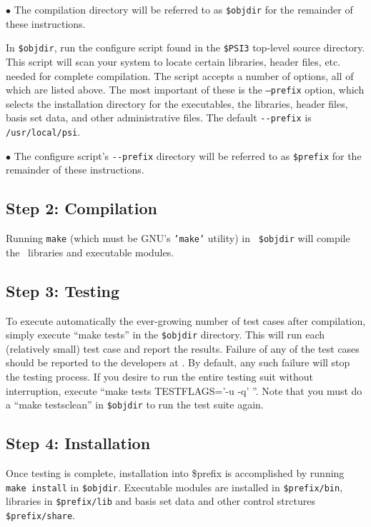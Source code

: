 \documentclass[12pt]{article}
\begin{document}
$\bullet$ The compilation directory will be referred to as {\tt \$objdir}
for the remainder of these instructions.

In {\tt \$objdir}, run the configure script found in the {\tt \$PSI3}
top-level source directory.  This script will scan your system to locate
certain libraries, header files, etc. needed for complete compilation.
The script accepts a number of options, all of which are listed above.
The most important of these is the {\tt --prefix} option, which selects the
installation directory for the executables, the libraries, header files,
basis set data, and other administrative files.  The default {\tt -}{\tt -prefix}
is {\tt /usr/local/psi}.

$\bullet$ The configure script's {\tt -}{\tt -prefix} directory will be referred
to as {\tt \$prefix} for the remainder of these instructions.

\subsection{Step 2: Compilation}

Running {\tt make} (which must be GNU's {\tt 'make'} utility) in {\tt
\$objdir} will compile the \PSIthree\ libraries and executable
modules.

\subsection{Step 3: Testing}

To execute automatically the ever-growing number of test cases after
compilation, simply execute ``make tests'' in the {\tt \$objdir}
directory.  This will run each (relatively small) test case and report
the results.  Failure of any of the test cases should be reported to
the developers at \PSIemail. By default, any such failure will stop
the testing process.  If you desire to run the entire testing suit
without interruption, execute ``make tests TESTFLAGS='-u -q' ''. Note
that you must do a ``make testsclean'' in {\tt \$objdir} to run the test
suite again.

\subsection{Step 4: Installation}

Once testing is complete, installation into \$prefix is accomplished by
running {\tt make install} in {\tt \$objdir}.   Executable modules are
installed in {\tt \$prefix/bin}, libraries in {\tt \$prefix/lib} and basis 
set data and other control strctures {\tt \$prefix/share}.
\end{document}
